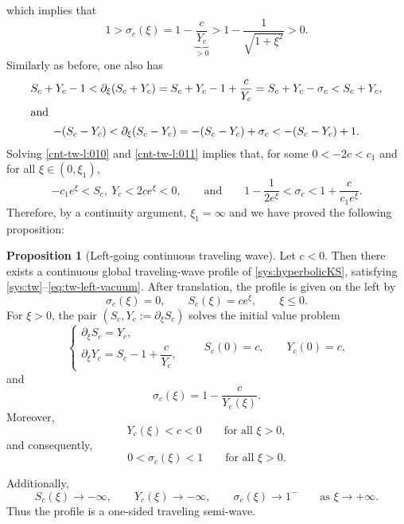 \documentclass[12pt]{article}
\theoremstyle{definition}
\newtheorem{proposition}[theorem]{Proposition}
\theoremstyle{remark}
\numberwithin{equation}{section}
\begin{document}
which implies that 
\begin{equation}
    \label{cnt-tw-l:009}
    1 > \sigma_c(\xi) = 1-  \underbrace{\frac{c}{Y_c}}_{>0} > 1 - \frac{1}{\sqrt{1+\xi^2}} > 0.
\end{equation}
Similarly as before, one also has
\begin{gather}
    \label{cnt-tw-l:010}
    S_c + Y_c - 1< \partial_\xi(S_c + Y_c) = S_c + Y_c - 1 + \frac{c}{Y_c} = S_c + Y_c - \sigma_c < S_c + Y_c,\\
    \intertext{and}
    \label{cnt-tw-l:011}
    - (S_c - Y_c) <\partial_\xi(S_c - Y_c) = - (S_c - Y_c) + \sigma_c < - (S_c - Y_c) + 1.
\end{gather}
Solving \eqref{cnt-tw-l:010} and \eqref{cnt-tw-l:011} implies that, for some $ 0  < -2c < c_1 $ and for all $ \xi \in (0,\xi_1) $,
\begin{equation}
    \label{cnt-tw-l:012}
    -c_1 e^\xi < S_c,\ Y_c < 2c e^\xi < 0, \qquad \text{and} \qquad  1 - \frac{1}{2 e^\xi} < \sigma_c < 1 + \frac{c}{c_1 e^\xi}.
\end{equation}
Therefore, by a continuity argument, $ \xi_1 = \infty $ and we have proved the following proposition: 
\begin{proposition}[Left-going continuous traveling wave]
    \label{prop:lg-cnt-tw}
    Let \(c<0\). Then there exists a continuous global traveling-wave profile of \eqref{sys:hyperbolicKS}, satisfying \eqref{sys:tw}--\eqref{eq:tw-left-vacuum}.
After translation, the profile is given on the left by
\[
\sigma_c(\xi)=0,
\qquad
S_c(\xi)=ce^\xi,
\qquad
\xi\le0.
\]
For \(\xi>0\), the pair \((S_c,Y_c :=\partial_\xi S_c )\)
solves the initial value problem
\begin{equation}
\begin{cases}
\partial_\xi S_c=Y_c,\\[4pt]
\partial_\xi Y_c=S_c-1+\dfrac{c}{Y_c},
\end{cases}
\qquad
S_c(0)=c,
\qquad
Y_c(0)=c,
\label{eq:tw-l-system}
\end{equation}
and
\begin{equation}
\sigma_c(\xi)=1-\frac{c}{Y_c(\xi)}.
\label{eq:tw-l-sigma}
\end{equation}
Moreover,
\[
Y_c(\xi)<c<0
\qquad
\text{for all }\xi>0,
\]
and consequently,
\[
0<\sigma_c(\xi)<1
\qquad
\text{for all }\xi>0.
\]

Additionally,
\[
S_c(\xi)\to -\infty,
\qquad
Y_c(\xi)\to -\infty,
\qquad
\sigma_c(\xi)\to1^-
\qquad
\text{as }\xi\to+\infty.
\]
Thus the profile is a one-sided traveling semi-wave.
\end{proposition}
\end{document}
